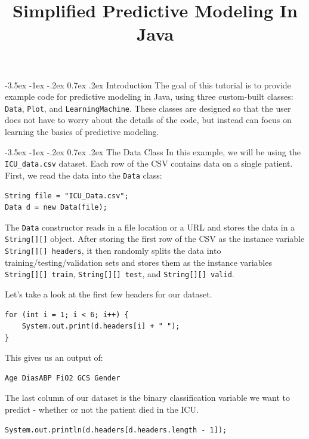 \documentclass{article}
\title{Simplified Predictive Modeling In Java \vspace{-8mm}}
\author{}
\date{}
\makeatletter
\renewcommand{\section}{\@startsection{section}{1}{\z@}%
    {-3.5ex \@plus -1ex \@minus -.2ex}%
    {0.7ex \@plus.2ex}%
    {\normalfont\Large\bfseries}}
\makeatother
\begin{document}
\maketitle

\section{Introduction}
The goal of this tutorial is to provide example code for predictive modeling in Java, using three custom-built classes: \verb|Data|, \verb|Plot|, and \verb|LearningMachine|. These classes are designed so that the user does not have to worry about the details of the code, but instead can focus on learning the basics of predictive modeling. 

\section{The Data Class}
In this example, we will be using the \verb|ICU_data.csv| dataset. Each row of the CSV contains data on a single patient. First, we read the data into the \verb|Data| class:

\begin{lstlisting}
String file = "ICU_Data.csv";
Data d = new Data(file);
\end{lstlisting}

The \verb|Data| constructor reads in a file location or a URL and stores the data in a \verb|String[][]| object. After storing the first row of the CSV as the instance variable \verb|String[][] headers|, it then randomly splits the data into training/testing/validation sets and stores them as the instance variables \verb|String[][] train|, \verb|String[][] test|, and \verb|String[][] valid|. 

Let's take a look at the first few headers for our dataset.
\begin{lstlisting}
for (int i = 1; i < 6; i++) {
    System.out.print(d.headers[i] + " ");
}
\end{lstlisting}

This gives us an output of: 
\begin{lstlisting}
Age DiasABP FiO2 GCS Gender 
\end{lstlisting}

The last column of our dataset is the binary classification variable we want to predict - whether or not the patient died in the ICU.

\begin{lstlisting}
System.out.println(d.headers[d.headers.length - 1]);
\end{lstlisting}
\end{document}
